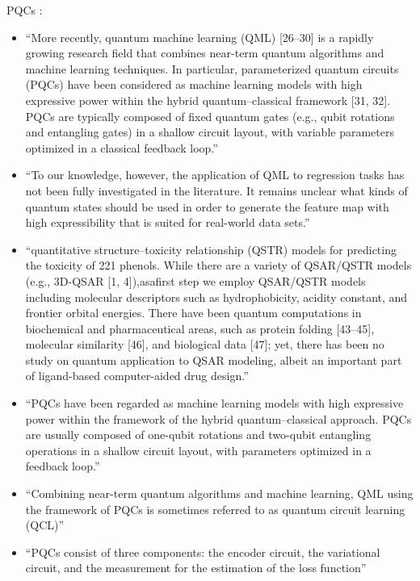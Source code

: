 \documentclass[journal=jacsat,manuscript=article]{achemso}
\begin{document}
PQCs \cite{suzuki_predicting_2020}:
\begin{itemize}
	\item ``More recently, quantum machine learning (QML) [26–30] is a rapidly growing research field that combines near-term quantum algorithms and machine learning techniques. In particular, parameterized quantum circuits (PQCs) have been considered as machine learning models with high expressive power within the hybrid quantum–classical framework [31, 32]. PQCs are typically composed of fixed quantum gates (e.g., qubit rotations and entangling gates) in a shallow circuit layout, with variable parameters optimized in a classical feedback loop.''
	\item ``To our knowledge, however, the application of QML to regression tasks has not been fully investigated in the literature. It remains unclear what kinds of quantum states should be used in order to generate the feature map with high expressibility that is suited for real-world data sets.''
	\item ``quantitative structure–toxicity relationship (QSTR) models for predicting the toxicity of 221 phenols. While there are a variety of QSAR/QSTR models (e.g., 3D-QSAR [1, 4]),asafirst step we employ QSAR/QSTR models including molecular descriptors such as hydrophobicity, acidity constant, and frontier orbital energies. There have been quantum computations in biochemical and pharmaceutical areas, such as protein folding [43–45], molecular similarity [46], and biological data [47]; yet, there has been no study on quantum application to QSAR modeling, albeit an important part of ligand-based computer-aided drug design.''
	\item ``PQCs have been regarded as machine learning models with high expressive power within the framework of the hybrid quantum–classical approach. PQCs are usually composed of one-qubit rotations and two-qubit entangling operations in a shallow circuit layout, with parameters optimized in a feedback loop.''
	\item ``Combining near-term quantum algorithms and machine learning, QML using the framework of PQCs is sometimes referred to as quantum circuit learning (QCL)''
	\item ``PQCs consist of three components: the encoder circuit, the variational circuit, and the measurement for the estimation of the loss function''
	
\end{itemize}
\end{document}
